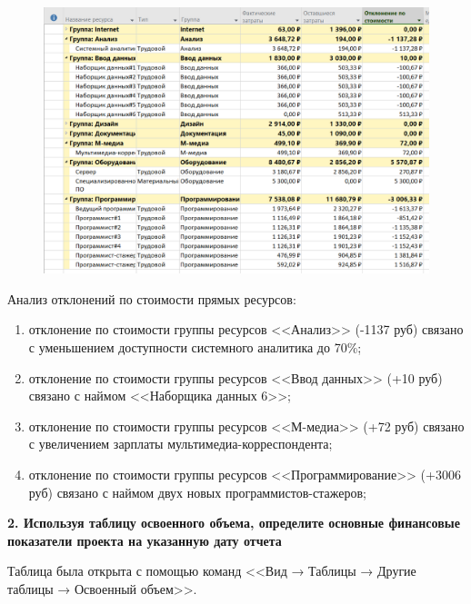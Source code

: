 \begin{figure}[h!]
	\begin{center}
		\includegraphics[scale=0.55]{inc/img/p_2.png}
	\end{center}
	\captionsetup{justification=centering}
	\label{fig:u3}
\end{figure}

\newpage

Анализ отклонений по стоимости прямых ресурсов:

\begin{enumerate}
    \item отклонение по стоимости группы ресурсов <<Анализ>> (-1137 руб) связано с уменьшением доступности системного аналитика до 70\%;
    \item отклонение по стоимости группы ресурсов <<Ввод данных>> (+10 руб) связано с наймом <<Наборщика данных 6>>;
    \item отклонение по стоимости группы ресурсов <<М-медиа>> (+72 руб) связано с увеличением зарплаты мультимедиа-корреспондента;
    \item отклонение по стоимости группы ресурсов <<Программирование>> (+3006 руб) связано с наймом двух новых программистов-стажеров;
\end{enumerate}


\newpage

\textbf{2. Используя таблицу освоенного объема, определите основные финансовые
показатели проекта на указанную дату отчета}

Таблица была открыта с помощью команд <<Вид → Таблицы → Другие таблицы → Освоенный объем>>.

